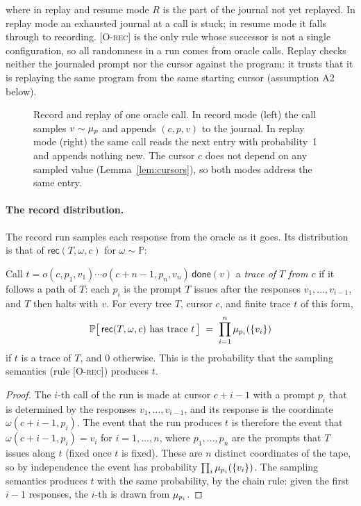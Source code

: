 where in replay and resume mode $R$ is the part of the journal not yet replayed.
In replay mode an exhausted journal at a call is stuck; in resume mode it falls through to
recording.
\textsc{[O-rec]} is the only rule whose successor is not a single configuration, so all
randomness in a run comes from oracle calls.
Replay checks neither the journaled prompt nor the cursor against the program: it trusts that
it is replaying the same program from the same starting cursor (assumption A2 below).

\begin{figure}[t]
  \centering
  \fitwidth{}
  \caption{Record and replay of one oracle call.
    In record mode (left) the call samples $v \sim \mu_{p}$ and appends $(c, p, v)$ to the
    journal. In replay mode (right) the same call reads the next entry with probability~1 and
    appends nothing new. The cursor $c$ does not depend on any sampled value
    (Lemma~\ref{lem:cursors}), so both modes address the same entry.}
  \label{fig:record-replay}
\end{figure}

\paragraph{The record distribution.}
The record run samples each response from the oracle as it goes.
Its distribution is that of $\mathsf{rec}(T, \omega, c)$ for $\omega \sim \mathbb{P}$:

\begin{lemma}
\label{lem:tape}
Call $t = o(c,p_1,v_1) \cdots o(c{+}n{-}1,p_n,v_n)\,\mathsf{done}(v)$ a \emph{trace of $T$
from $c$} if it follows a path of $T$: each $p_i$ is the prompt $T$ issues after the responses
$v_1, \ldots, v_{i-1}$, and $T$ then halts with $v$.
For every tree $T$, cursor $c$, and finite trace $t$ of this form,
\[
  \mathbb{P}\bigl[\,\mathsf{rec}(T,\omega,c) \text{ has trace } t\,\bigr]
  \;=\; \prod_{i=1}^{n} \mu_{p_i}(\{v_i\})
\]
if $t$ is a trace of $T$, and $0$ otherwise. This is the probability that the sampling
semantics (rule \textsc{[O-rec]}) produces $t$.
\end{lemma}

\begin{proof}
The $i$-th call of the run is made at cursor $c+i-1$ with a prompt $p_i$ that is determined by
the responses $v_1, \ldots, v_{i-1}$, and its response is the coordinate
$\omega(c+i-1, p_i)$.
The event that the run produces $t$ is therefore the event that
$\omega(c+i-1, p_i) = v_i$ for $i = 1, \ldots, n$, where $p_1, \ldots, p_n$ are the prompts
that $T$ issues along $t$ (fixed once $t$ is fixed).
These are $n$ distinct coordinates of the tape, so by independence the event has probability
$\prod_i \mu_{p_i}(\{v_i\})$.
The sampling semantics produces $t$ with the same probability, by the chain rule:
given the first $i-1$ responses, the $i$-th is drawn from $\mu_{p_i}$.
\end{proof}
